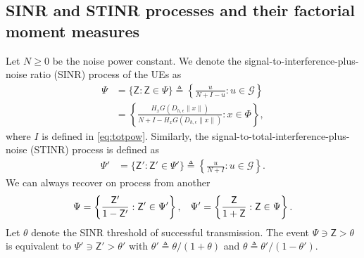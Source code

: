 \documentclass[lettersize,journal]{IEEEtran}
\begin{document}
\subsection{SINR and STINR processes and their factorial moment measures}
Let $N \geq 0$ be the noise power constant. We denote the signal-to-interference-plus-noise ratio (SINR) process of the UEs as
\begin{align}
  \label{eq:SINR}
  \Psi &= \{\mathsf{Z}: \mathsf{Z} \in \Psi\} \triangleq \left\{ \frac{u}{N+I-u} : u \in \mathcal{G}\right\} \nonumber \\
  &=\left\{ \frac{H_x G(D_{h,\epsilon}\|x\|)}{N+I-H_x G(D_{h,\epsilon}\|x\|)} : x \in \Phi\right\},
\end{align}
where $I$ is defined in \eqref{eq:totpow}. Similarly, the signal-to-total-interference-plus-noise (STINR) process is defined as
\begin{align}
  \label{eq:STINR}
  \Psi' &= \{\mathsf{Z}': \mathsf{Z}' \in \Psi'\} \triangleq \left\{ \frac{u}{N+I} : u \in \mathcal{G}\right\}.
\end{align}
We can always recover on process from another
\begin{equation}
  \Psi = \left\{ \frac{\mathsf{Z}'}{1- \mathsf{Z}'}: \mathsf{Z}' \in \Psi' \right\}, \hspace{0.3cm} \Psi' = \left\{ \frac{\mathsf{Z}}{1+ \mathsf{Z}}: \mathsf{Z} \in \Psi \right\}.
\end{equation}
Let $\theta$ denote the SINR threshold of successful transmission. The event $\Psi \ni\mathsf{Z}> \theta$ is equivalent to $\Psi' \ni \mathsf{Z}'> \theta'$  with $\theta' \triangleq \theta/(1+\theta)$ and $\theta \triangleq \theta'/(1-\theta')$.
\end{document}
